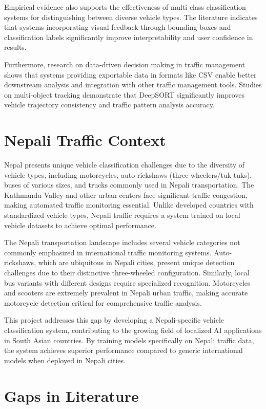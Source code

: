 \documentclass[12pt,a4paper]{report}
\begin{document}
Empirical evidence also supports the effectiveness of multi-class classification systems for distinguishing between diverse vehicle types. The literature indicates that systems incorporating visual feedback through bounding boxes and classification labels significantly improve interpretability and user confidence in results.

Furthermore, research on data-driven decision making in traffic management shows that systems providing exportable data in formats like CSV enable better downstream analysis and integration with other traffic management tools. Studies on multi-object tracking demonstrate that DeepSORT significantly improves vehicle trajectory consistency and traffic pattern analysis accuracy.

\section{Nepali Traffic Context}

Nepal presents unique vehicle classification challenges due to the diversity of vehicle types, including motorcycles, auto-rickshaws (three-wheelers/tuk-tuks), buses of various sizes, and trucks commonly used in Nepali transportation. The Kathmandu Valley and other urban centers face significant traffic congestion, making automated traffic monitoring essential. Unlike developed countries with standardized vehicle types, Nepali traffic requires a system trained on local vehicle datasets to achieve optimal performance.

The Nepali transportation landscape includes several vehicle categories not commonly emphasized in international traffic monitoring systems. Auto-rickshaws, which are ubiquitous in Nepali cities, present unique detection challenges due to their distinctive three-wheeled configuration. Similarly, local bus variants with different designs require specialized recognition. Motorcycles and scooters are extremely prevalent in Nepali urban traffic, making accurate motorcycle detection critical for comprehensive traffic analysis.

This project addresses this gap by developing a Nepali-specific vehicle classification system, contributing to the growing field of localized AI applications in South Asian countries. By training models specifically on Nepali traffic data, the system achieves superior performance compared to generic international models when deployed in Nepali cities.


\section{Gaps in Literature}
\end{document}
